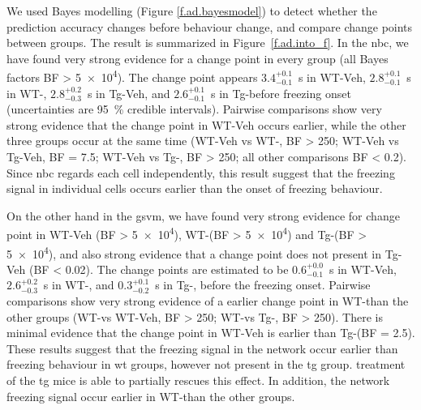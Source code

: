 We used Bayes modelling (Figure \ref{f.ad.bayesmodel}) to detect whether the prediction accuracy changes before behaviour change, and compare change points between groups. The result is summarized in Figure~\ref{f.ad.into_f}. In the \gls{nbc}, we have found very strong evidence for a change point in every group (all Bayes factors BF > \num{5e4}). The change point appears $3.4_{-0.1}^{+0.1}$\SI{}{\s} in WT-Veh, $2.8_{-0.1}^{+0.1}$\SI{}{\second} in WT-\glu, $2.8_{-0.3}^{+0.2}$\SI{}{\second} in Tg-Veh, and $2.6_{-0.1}^{+0.1}$\SI{}{\second} in Tg-\glu before freezing onset (uncertainties are \SI{95}{\percent} credible intervals). Pairwise comparisons show very strong evidence that the change point in WT-Veh occurs earlier, while the other three groups occur at the same time (WT-Veh vs WT-\glu, BF > \num{250}; WT-Veh vs Tg-Veh, BF = \num{7.5}; WT-Veh vs Tg-\glu, BF > \num{250}; all other comparisons BF < \num{0.2}). Since \gls{nbc} regards each cell independently, this result suggest that the freezing signal in individual cells occurs earlier than the onset of freezing behaviour.

On the other hand in the \gls{gsvm}, we have found very strong evidence for change point in WT-Veh (BF > \num{5e4}), WT-\glu (BF > \num{5e4}) and Tg-\glu (BF > \num{5e4}), and also strong evidence that a change point does not present in Tg-Veh (BF < \num{0.02}). The change points are estimated to be $0.6_{-0.1}^{+0.0}$\SI{}{\s} in WT-Veh, $2.6_{-0.3}^{+0.2}$\SI{}{\second} in WT-\glu, and $0.3_{-0.2}^{+0.1}$\SI{}{\s} in Tg-\glu, before the freezing onset. Pairwise comparisons show very strong evidence of a earlier change point in WT-\glu than the other groups (WT-\glu vs WT-Veh, BF > \num{250}; WT-\glu vs Tg-\glu, BF > \num{250}). There is minimal evidence that the change point in WT-Veh is earlier than Tg-\glu (BF = \num{2.5}). These results suggest that the freezing signal in the network occur earlier than freezing behaviour in \gls{wt} groups, however not present in the \gls{tg} group. \tglu treatment of the \gls{tg} mice is able to partially rescues this effect. In addition, the network freezing signal occur earlier in WT-\glu than the other groups.


